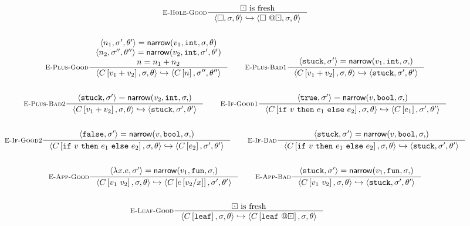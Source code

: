 \begin{figure*}
\begin{gather*}
\inference[\reholegood]
  {\thole \mbox{ is fresh}}
  {\step{\ehole}{\vsu}{\tsu}{\vhole{\thole}}{\vsu}{\tsu}}
\\ \\
\inference[\replusgood]
  {\triple{n_1}{\vsu'}{\tsu'} = \force{v_1}{\tint}{\vsu}{\tsu} \\
   \triple{n_2}{\vsu''}{\tsu''} = \force{v_2}{\tint}{\vsu'}{\tsu'} \\
   n = \eplus{n_1}{n_2}}
  {\step{\inctx{\eplus{v_1}{v_2}}}{\vsu}{\tsu}{\inctx{n}}{\vsu''}{\tsu''}}
\qquad
\inference[\replusbadone]
  {\pair{\stuck}{\su'} = \force{v_1}{\tint}{\su}}
  {\step{\inctx{\eplus{v_1}{v_2}}}{\vsu}{\tsu}{\stuck}{\vsu'}{\tsu'}}
\\ \\
\inference[\replusbadtwo]
  {\pair{\stuck}{\su'} = \force{v_2}{\tint}{\su}}
  {\step{\inctx{\eplus{v_1}{v_2}}}{\vsu}{\tsu}{\stuck}{\vsu'}{\tsu'}}
\qquad
\inference[\reifgoodone]
  {\pair{\etrue}{\su'} = \force{v}{\tbool}{\su}}
  {\step{\inctx{\eif{v}{e_1}{e_2}}}{\vsu}{\tsu}{\inctx{e_1}}{\vsu'}{\tsu'}}
\\ \\
\inference[\reifgoodtwo]
  {\pair{\efalse}{\su'} = \force{v}{\tbool}{\su}}
  {\step{\inctx{\eif{v}{e_1}{e_2}}}{\vsu}{\tsu}{\inctx{e_2}}{\vsu'}{\tsu'}}
\qquad
\inference[\reifbad]
  {\pair{\stuck}{\su'} = \force{v}{\tbool}{\su}}
  {\step{\inctx{\eif{v}{e_1}{e_2}}}{\vsu}{\tsu}{\stuck}{\vsu'}{\tsu'}}
\\ \\
\inference[\reappgood]
  {\pair{\efun{x}{e}}{\su'} = \force{v_1}{\tfun}{\su}}
  {\step{\inctx{\eapp{v_1}{v_2}}}{\vsu}{\tsu}{\inctx{e\sub{x}{v_2}}}{\vsu'}{\tsu'}}
\qquad
\inference[\reappbad]
  {\pair{\stuck}{\su'} = \force{v_1}{\tfun}{\su}}
  {\step{\inctx{\eapp{v_1}{v_2}}}{\vsu}{\tsu}{\stuck}{\vsu'}{\tsu'}}
\\ \\
\inference[\releafgood]
  {\thole \mbox{ is fresh}}
  {\step{\inctx{\eleaf}}{\vsu}{\tsu}{\inctx{\vleaf{\thole}}}{\vsu}{\tsu}}
\qquad

\end{gather*}
\end{figure*}
